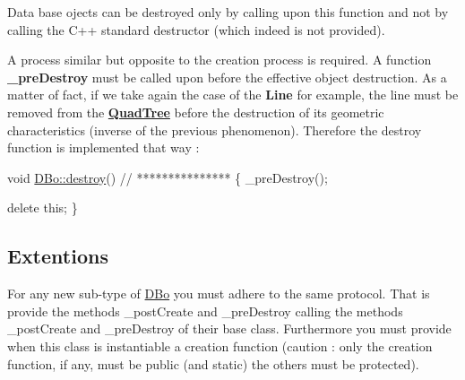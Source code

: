 Data base ojects can be destroyed only by calling upon this function and not by calling the C++ standard destructor (which indeed is not provided).

A process similar but opposite to the creation process is required. A function {\bfseries \+\_\+pre\+Destroy} must be called upon before the effective object destruction. As a matter of fact, if we take again the case of the {\bfseries Line} for example, the line must be removed from the {\bfseries \mbox{\hyperlink{classHurricane_1_1QuadTree}{Quad\+Tree}}} before the destruction of its geometric characteristics (inverse of the previous phenomenon). Therefore the destroy function is implemented that way \+: 
\begin{DoxyCode}
\textcolor{keywordtype}{void} \mbox{\hyperlink{classHurricane_1_1DBo_a67febf5bf9c8b322674648688639728b}{DBo::destroy}}()
\textcolor{comment}{// ***************}
\{
  \_preDestroy();
                
  \textcolor{keyword}{delete} \textcolor{keyword}{this};
\}
\end{DoxyCode}
\hypertarget{classHurricane_1_1DBo_sDBoExtentions}{}\subsection{Extentions}\label{classHurricane_1_1DBo_sDBoExtentions}
For any new sub-\/type of \mbox{\hyperlink{classHurricane_1_1DBo}{D\+Bo}} you must adhere to the same protocol. That is provide the methods \+\_\+post\+Create and \+\_\+pre\+Destroy calling the methods \+\_\+post\+Create and \+\_\+pre\+Destroy of their base class. Furthermore you must provide when this class is instantiable a creation function (caution \+: only the creation function, if any, must be {\ttfamily public} (and {\ttfamily static}) the others must be {\ttfamily protected}).

